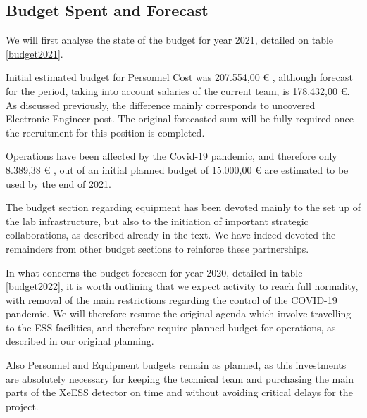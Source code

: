 \documentclass[12pt,a4paper,article]{report} %
\begin{document}
\subsection*{Budget Spent and Forecast}

We will first analyse the state of the budget for year 2021, detailed on table \ref{budget2021}. 

Initial estimated budget for Personnel Cost was  207.554,00 \euro{} , although  forecast for the period, taking into account salaries of the current team, is 178.432,00 \euro{}. As discussed previously, the difference mainly corresponds to uncovered Electronic Engineer post. The original forecasted sum will be fully required once the recruitment for this position is completed. 

Operations have been affected by the Covid-19 pandemic, and therefore only 8.389,38 \euro{} , out of an initial planned budget of 15.000,00 \euro{} are estimated to be used by the end of 2021. 

The budget section regarding equipment has been devoted mainly to the set up of the lab infrastructure, but also to the initiation of important strategic collaborations, as described already in the text. We have indeed devoted the remainders from other budget sections to reinforce these partnerships.

In what concerns the budget foreseen for year 2020, detailed in table \ref{budget2022}, it is worth outlining that we expect activity to reach full normality, with removal of the main restrictions regarding the control of the COVID-19 pandemic. We will therefore resume the original agenda which involve travelling to the ESS facilities, and therefore require planned budget for operations, as described in our original planning. 

Also Personnel and Equipment budgets remain as planned, as this investments are absolutely necessary for keeping the technical team and purchasing the main parts of the XeESS detector on time and without avoiding critical delays for the project.
\end{document}
